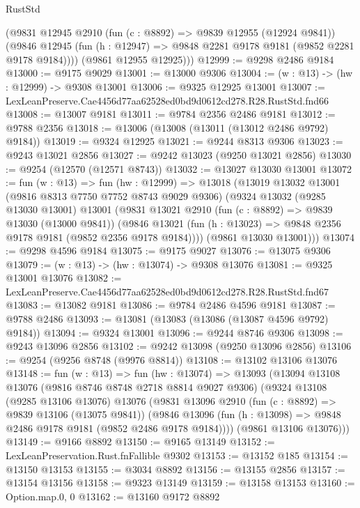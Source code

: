 \begin{lexlean}{RustStd}
\begin{coremodule}
        (@9831
          @12945
          @2910
          (fun (c : @8892) => @9839 @12955 (@12924 @9841))
          (@9846 @12945 (fun (h : @12947) => @9848 @2281 @9178 @9181 (@9852 @2281 @9178 @9184))))
        (@9861 @12955 @12925)))
@12999 := @9298 @2486 @9184
@13000 := @9175 @9029
@13001 := @13000 @9306
@13004 := (w : @13) -> (hw : @12999) -> @9308 @13001
@13006 := @9325 @12925 @13001
@13007 := LexLeanPreserve.Cae4456d77aa62528ed0bd9d0612cd278.R28.RustStd.fnd66
@13008 := @13007 @9181
@13011 := @9784 @2356 @2486 @9181
@13012 := @9788 @2356
@13018 := @13006 (@13008 (@13011 (@13012 @2486 @9792) @9184))
@13019 := @9324 @12925
@13021 := @9244 @8313 @9306
@13023 := @9243 @13021 @2856
@13027 := @9242 @13023 (@9250 @13021 @2856)
@13030 := @9254 (@12570 (@12571 @8743))
@13032 := @13027 @13030 @13001
@13072 := fun (w : @13) =>
  fun (hw : @12999) =>
  @13018
    (@13019
      @13032
      @13001
      (@9816 @8313 @7750 @7752 @8743 @9029 @9306)
      (@9324
        @13032
        (@9285 @13030 @13001)
        @13001
        (@9831
          @13021
          @2910
          (fun (c : @8892) => @9839 @13030 (@13000 @9841))
          (@9846 @13021 (fun (h : @13023) => @9848 @2356 @9178 @9181 (@9852 @2356 @9178 @9184))))
        (@9861 @13030 @13001)))
@13074 := @9298 @4596 @9184
@13075 := @9175 @9027
@13076 := @13075 @9306
@13079 := (w : @13) -> (hw : @13074) -> @9308 @13076
@13081 := @9325 @13001 @13076
@13082 := LexLeanPreserve.Cae4456d77aa62528ed0bd9d0612cd278.R28.RustStd.fnd67
@13083 := @13082 @9181
@13086 := @9784 @2486 @4596 @9181
@13087 := @9788 @2486
@13093 := @13081 (@13083 (@13086 (@13087 @4596 @9792) @9184))
@13094 := @9324 @13001
@13096 := @9244 @8746 @9306
@13098 := @9243 @13096 @2856
@13102 := @9242 @13098 (@9250 @13096 @2856)
@13106 := @9254 (@9256 @8748 (@9976 @8814))
@13108 := @13102 @13106 @13076
@13148 := fun (w : @13) =>
  fun (hw : @13074) =>
  @13093
    (@13094
      @13108
      @13076
      (@9816 @8746 @8748 @2718 @8814 @9027 @9306)
      (@9324
        @13108
        (@9285 @13106 @13076)
        @13076
        (@9831
          @13096
          @2910
          (fun (c : @8892) => @9839 @13106 (@13075 @9841))
          (@9846 @13096 (fun (h : @13098) => @9848 @2486 @9178 @9181 (@9852 @2486 @9178 @9184))))
        (@9861 @13106 @13076)))
@13149 := @9166 @8892
@13150 := @9165 @13149
@13152 := LexLeanPreservation.Rust.fnFallible @9302
@13153 := @13152 @185
@13154 := @13150 @13153
@13155 := @3034 @8892
@13156 := @13155 @2856
@13157 := @13154 @13156
@13158 := @9323 @13149
@13159 := @13158 @13153
@13160 := Option.map.{0, 0}
@13162 := @13160 @9172 @8892

\end{coremodule}
\end{lexlean}
